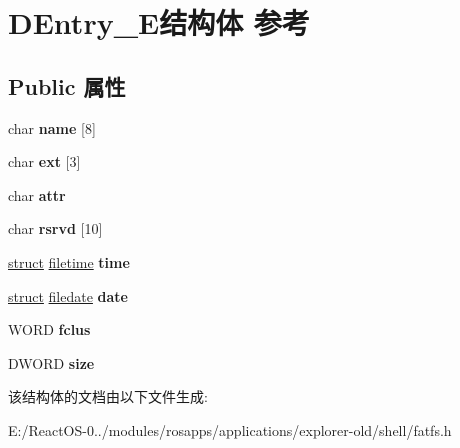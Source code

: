 \hypertarget{struct_d_entry___e}{}\section{D\+Entry\+\_\+\+E结构体 参考}
\label{struct_d_entry___e}
\subsection*{Public 属性}
\begin{DoxyCompactItemize}
\item 
\mbox{\label{struct_d_entry___e_a7d57fe75596d47a5d1db03ccd42cf664}} 
char {\bfseries name} \mbox{[}8\mbox{]}
\item 
\mbox{\label{struct_d_entry___e_ab75a3b35b44d9a1003589a6cf7747254}} 
char {\bfseries ext} \mbox{[}3\mbox{]}
\item 
\mbox{\label{struct_d_entry___e_a6bb00122ca9b401781714bfa24e43a6f}} 
char {\bfseries attr}
\item 
\mbox{\label{struct_d_entry___e_add5c05b11c893de7a763727d08b5d275}} 
char {\bfseries rsrvd} \mbox{[}10\mbox{]}
\item 
\mbox{\label{struct_d_entry___e_ae2d4ff8311e04c6ac9a0bc378634add3}} 
\hyperlink{interfacestruct}{struct} \hyperlink{structfiletime}{filetime} {\bfseries time}
\item 
\mbox{\label{struct_d_entry___e_af6331e745dced5a42e9ee9bd9ee5f034}} 
\hyperlink{interfacestruct}{struct} \hyperlink{structfiledate}{filedate} {\bfseries date}
\item 
\mbox{\label{struct_d_entry___e_a03c208ad013871db9decca042f27a616}} 
W\+O\+RD {\bfseries fclus}
\item 
\mbox{\label{struct_d_entry___e_a33e7f8db758d21d472e6519effb2d7a7}} 
D\+W\+O\+RD {\bfseries size}
\end{DoxyCompactItemize}


该结构体的文档由以下文件生成\+:\begin{DoxyCompactItemize}
\item 
E\+:/\+React\+O\+S-\/0../modules/rosapps/applications/explorer-\/old/shell/fatfs.\+h\end{DoxyCompactItemize}
